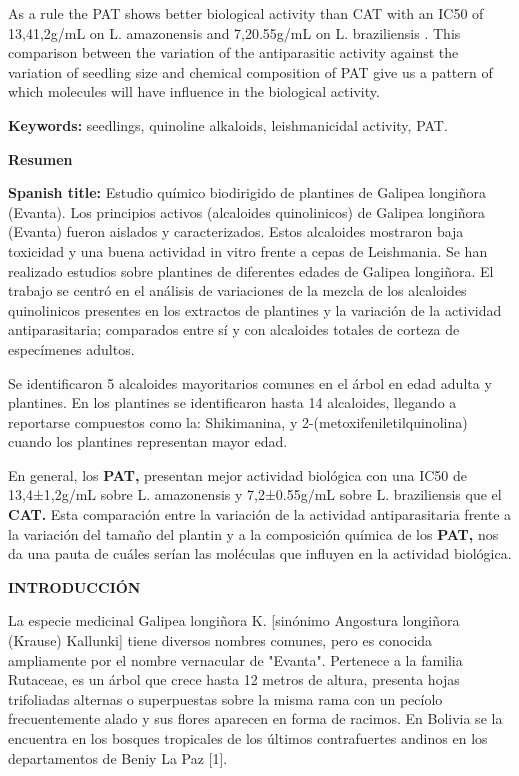 \documentclass{article}
\begin{document}
As a rule the PAT shows better biological activity than CAT with an IC50 of
13,41,2g/mL on L. amazonensis and 7,20.55g/mL on L. braziliensis . This
comparison between the variation of the antiparasitic activity against the
variation of seedling size and chemical composition of PAT give us a pattern of
which molecules will have influence in the biological activity.

\textbf{Keywords: }
seedlings, quinoline alkaloids, leishmanicidal activity, PAT.

\textbf{Resumen}

\textbf{Spanish title: }
Estudio químico biodirigido de plantines de Galipea longiñora (Evanta). Los
principios activos (alcaloides quinolinicos) de Galipea longiñora (Evanta)
fueron aislados y caracterizados. Estos alcaloides mostraron baja toxicidad y
una buena actividad in vitro frente a cepas de Leishmania. Se han realizado
estudios sobre plantines de diferentes edades de Galipea longiñora. El trabajo
se centró en el análisis de variaciones de la mezcla de los alcaloides
quinolinicos presentes en los extractos de plantines y la variación de la
actividad antiparasitaria; comparados entre sí y con alcaloides totales de
corteza de especímenes adultos.

Se identificaron 5 alcaloides mayoritarios comunes en el árbol en edad adulta y
plantines. En los plantines se identificaron hasta 14 alcaloides, llegando a
reportarse compuestos como la: Shikimanina, y 2-(metoxifeniletilquinolina)
cuando los plantines representan mayor edad.

En general, los \textbf{PAT, }
presentan mejor actividad biológica con una IC50 de 13,4±1,2g/mL sobre L.
amazonensis y 7,2±0.55g/mL sobre L. braziliensis que el \textbf{CAT. }
Esta comparación entre la variación de la actividad antiparasitaria frente a la
variación del tamaño del plantin y a la composición química de los \textbf{PAT,
}
nos da una pauta de cuáles serían las moléculas que influyen en la actividad
biológica.

\textbf{INTRODUCCIÓN}

La especie medicinal Galipea longiñora K. [sinónimo Angostura longiñora (Krause)
Kallunki] tiene diversos nombres comunes, pero es conocida ampliamente por el
nombre vernacular de "Evanta". Pertenece a la familia Rutaceae, es un árbol que
crece hasta 12 metros de altura, presenta hojas trifoliadas alternas o
superpuestas sobre la misma rama con un pecíolo frecuentemente alado y sus
flores aparecen en forma de racimos. En Bolivia se la encuentra en los bosques
tropicales de los últimos contrafuertes andinos en los departamentos de Beniy La
Paz [1].
\end{document}
